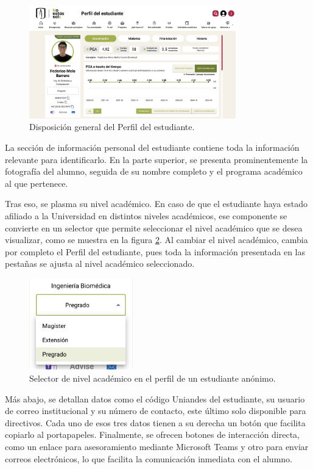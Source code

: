 \begin{figure}[H]
	\centering
	\includegraphics[width=0.8\textwidth]{assets/nes/perfil.png}
	\caption{Disposición general del Perfil del estudiante.}
	\label{fig:perfil}
\end{figure}

La sección de información personal del estudiante contiene toda la información relevante para identificarlo. En la parte superior, se presenta prominentemente la fotografía del alumno, seguida de su nombre completo y el programa académico al que pertenece.

Tras eso, se plasma su nivel académico. En caso de que el estudiante haya estado afiliado a la Universidad en distintos niveles académicos, ese componente se convierte en un selector que permite seleccionar el nivel académico que se desea visualizar, como se muestra en la figura \ref{fix:selector}. Al cambiar el nivel académico, cambia por completo el Perfil del estudiante, pues toda la información presentada en las pestañas se ajusta al nivel académico seleccionado.

\begin{figure}[H]
	\centering
	\includegraphics[width=0.4\textwidth]{assets/nes/selector.png}
	\caption{Selector de nivel académico en el perfil de un estudiante anónimo.}
	\label{fix:selector}
\end{figure}

Más abajo, se detallan datos como el código Uniandes del estudiante, su usuario de correo institucional y su número de contacto, este último solo disponible para directivos. Cada uno de esos tres datos tienen a su derecha un botón que facilita copiarlo al portapapeles. Finalmente, se ofrecen botones de interacción directa, como un enlace para asesoramiento mediante Microsoft Teams y otro para enviar correos electrónicos, lo que facilita la comunicación inmediata con el alumno.

